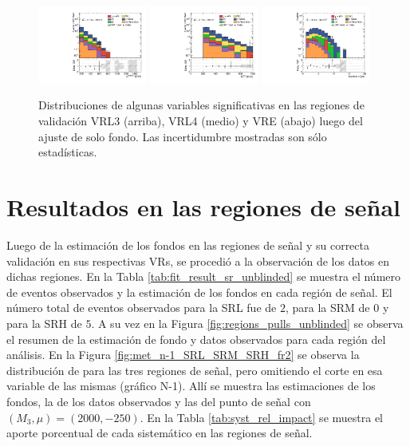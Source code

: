 \begin{figure}[ht!]
    \includegraphics[width=0.32\textwidth]{images/results/fr2_unblind/can_VRE_ph_pt0_afterFit.pdf}
    \includegraphics[width=0.32\textwidth]{images/results/fr2_unblind/can_VRE_met_et_afterFit.pdf}
    \includegraphics[width=0.32\textwidth]{images/results/fr2_unblind/can_VRE_jet_n_afterFit.pdf}

    
    \caption{Distribuciones de algunas variables significativas en las regiones de validación VRL3 (arriba), VRL4 (medio) y VRE (abajo) luego del ajuste de solo fondo. Las incertidumbre mostradas son sólo estadísticas.}
    \label{fig:dist_vrle_bkgonly}
\end{figure}






\section{Resultados en las regiones de señal}

Luego de la estimación de los fondos en las regiones de señal y su correcta validación en sus respectivas VRs, se procedió a la observación de los datos en dichas regiones. En la Tabla \ref{tab:fit_result_sr_unblinded} se muestra el número de eventos observados y la estimación de los fondos en cada región de señal. El número total de eventos observados para la SRL fue de $2$, para la SRM de $0$ y para la SRH de $5$. A su vez en la Figura \ref{fig:regions_pulls_unblinded} se observa el resumen de la estimación de fondo y datos observados para cada región del análisis. En la Figura \ref{fig:met_n-1_SRL_SRM_SRH_fr2} se observa la distribución de \met para las tres regiones de señal, pero omitiendo el corte en esa variable de las mismas (gráfico N-1). Allí se muestra las estimaciones de los fondos, la de los datos observados y las del punto de señal con $(M_3, \mu) = (2000, -250)$. En la Tabla \ref{tab:syst_rel_impact} se muestra el aporte porcentual de cada sistemático en las regiones de señal.


